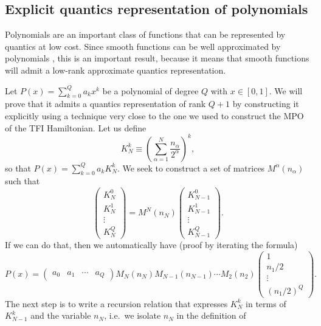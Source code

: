 \documentclass{SciPost}
\begin{document}
\subsection{Explicit quantics representation of polynomials}
Polynomials are an important class of functions that can be represented by quantics at low cost. Since smooth functions can be well approximated by polynomials \cite{trefethen2019}, this is an important result, because it means that smooth functions will admit a low-rank approximate quantics representation.

Let $P(x) = \sum_{k=0}^Q a_k x^k$ be a polynomial of degree $Q$ with $x\in[0,1]$. We will prove that it admits a quantics representation of rank $Q+1$ by constructing it explicitly using a technique very close to the one we used to construct the MPO of the TFI Hamiltonian. Let us define
\begin{equation}
K_N^k \equiv \left( \sum_{\alpha=1}^N \frac{n_\alpha}{2^{\alpha}} \right)^k,
\end{equation}
so that $P(x) = \sum_{k=0}^Q a_k K_N^k$. We seek to construct a set of matrices $M^\alpha(n_\alpha)$ such that
\begin{equation}
\begin{pmatrix}
K^0_N \\ K^1_N \\ \vdots \\ K^Q_N
\end{pmatrix}
= M^N(n_N)
\begin{pmatrix}
K^0_{N-1} \\ K^1_{N-1} \\ \vdots \\ K^Q_{N-1}
\end{pmatrix}.
\end{equation}
If we can do that, then we automatically have (proof by iterating the formula)
\begin{equation}
P(x) =
\begin{pmatrix}
a_0 & a_1 & \cdots & a_Q
\end{pmatrix}
M_N(n_N) M_{N-1}(n_{N-1}) \cdots M_2(n_2)
\begin{pmatrix}
1 \\ n_1/2 \\ \vdots \\ (n_1/2)^Q
\end{pmatrix}.
\end{equation}
The next step is to write a recursion relation that expresses $K_N^k$ in terms of
$K_{N-1}^k$ and the variable $n_N$, i.e.\ we isolate $n_N$ in the definition of
\end{document}
